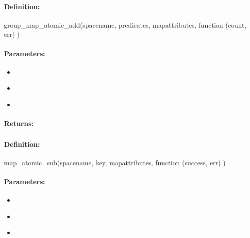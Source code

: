 \paragraph{Definition:}
\begin{javascriptcode}
group_map_atomic_add(spacename, predicates, mapattributes, function (count, err) {})
\end{javascriptcode}
\paragraph{Parameters:}
\begin{itemize}[noitemsep]
\item {}\\

\item {}\\

\item {}\\

\end{itemize}

\paragraph{Returns:}


\pagebreak
\subsubsection{}
\label{api:nodejs:map_atomic_sub}


\paragraph{Definition:}
\begin{javascriptcode}
map_atomic_sub(spacename, key, mapattributes, function (success, err) {})
\end{javascriptcode}
\paragraph{Parameters:}
\begin{itemize}[noitemsep]
\item {}\\

\item {}\\

\item {}\\

\end{itemize}

